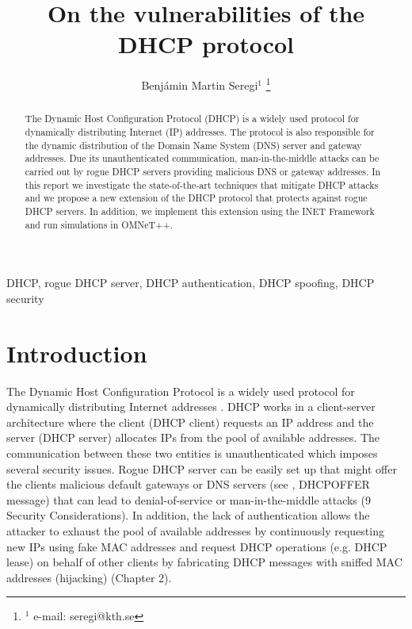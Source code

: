 \documentclass[letterpaper, 10 pt, conference]{ieeeconf}  %
\title{\LARGE \bf
On the vulnerabilities of the DHCP protocol
}
\author{Benjámin Martin Seregi$^{1}$%
\thanks{$^{1}$ e-mail: seregi@kth.se}%
}
\begin{document}
\maketitle
\thispagestyle{fancy}
\fancyhf{}

\begin{abstract}
The Dynamic Host Configuration Protocol (DHCP) is a widely used protocol for dynamically distributing Internet (IP) addresses. The protocol is also responsible for the dynamic distribution of the Domain Name System (DNS) server and gateway addresses. Due its unauthenticated communication, man-in-the-middle attacks can be carried out by rogue DHCP servers providing malicious DNS or gateway addresses. In this report we investigate the state-of-the-art techniques that mitigate DHCP attacks and we propose a new extension of the DHCP protocol that protects against rogue DHCP servers. In addition, we implement this extension using the INET Framework and run simulations in OMNeT++.
\end{abstract}

\begin{keywords}
DHCP, rogue DHCP server, DHCP authentication, DHCP spoofing, DHCP security
\end{keywords}

\section{Introduction}
The Dynamic Host Configuration Protocol is a widely used protocol for dynamically distributing Internet addresses \cite{dhcprfc}. DHCP works in a client-server architecture where the client (DHCP client) requests an IP address and the server (DHCP server) allocates IPs from the pool of available addresses. The communication between these two entities is unauthenticated \cite{dhcprfc} which imposes several security issues. Rogue DHCP server can be easily set up that might offer the clients malicious default gateways or DNS servers (see \cite{dhcprfc}, DHCPOFFER message) that can lead to denial-of-service or man-in-the-middle attacks \cite{Rooney:2010:IIA:1951974} (9 Security Considerations). In addition, the lack of authentication allows the attacker to exhaust the pool of available addresses by continuously requesting new IPs using fake MAC addresses and request DHCP operations (e.g. DHCP lease) on behalf of other clients by fabricating DHCP messages with sniffed MAC addresses (hijacking) \cite{practical-embedded-security} (Chapter 2).
\end{document}
